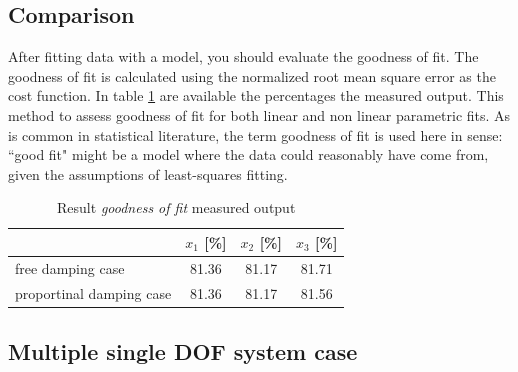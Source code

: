 \subsection{Comparison}
\label{subsec:comparison}
After fitting data with a model, you should evaluate the goodness of fit. 
The goodness of fit is calculated using the normalized root mean square error 
as the cost function.
In table \ref{tab:goodoffit} are available the percentages the measured output.
This method to assess goodness of fit for both linear and non linear parametric 
fits.
As is common in statistical literature, the term goodness of fit is used here 
in sense: ``good fit" might be a model where the data could reasonably have 
come from, given the assumptions of least-squares fitting.
\begin{table}[ht]
\centering
\begin{tabular}{lccc}
	\toprule
		 & $x_1$ [\%] & $x_2$ [\%] & $x_3$ [\%]\\
	\midrule
	free damping case & 81.36 & 81.17 & 81.71 \\
	proportinal damping case & 81.36 & 81.17 & 81.56 \\
	\bottomrule
\end{tabular}
\caption{Result \emph{goodness of fit} measured output}
\label{tab:goodoffit}
\end{table}
%
\subsection{Multiple single DOF system case}
